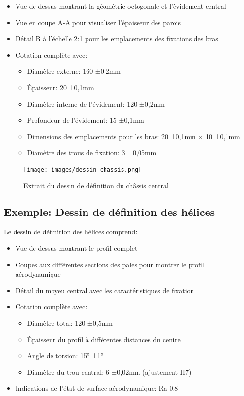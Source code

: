 \documentclass[a4paper,12pt]{report}
\begin{document}
\begin{itemize}
    \item Vue de dessus montrant la géométrie octogonale et l'évidement central
    \item Vue en coupe A-A pour visualiser l'épaisseur des parois
    \item Détail B à l'échelle 2:1 pour les emplacements des fixations des bras
    \item Cotation complète avec:
        \begin{itemize}
            \item Diamètre externe: 160 ±0,2mm
            \item Épaisseur: 20 ±0,1mm
            \item Diamètre interne de l'évidement: 120 ±0,2mm
            \item Profondeur de l'évidement: 15 ±0,1mm
            \item Dimensions des emplacements pour les bras: 20 ±0,1mm × 10 ±0,1mm
            \item Diamètre des trous de fixation: 3 ±0,05mm
        \end{itemize}
\end{itemize}

\begin{figure}[H]
    \centering
    \texttt{[image: images/dessin\_chassis.png]}
    \caption{Extrait du dessin de définition du châssis central}
    \label{fig:dessin_def}
\end{figure}

\subsection{Exemple: Dessin de définition des hélices}
Le dessin de définition des hélices comprend:

\begin{itemize}
    \item Vue de dessus montrant le profil complet
    \item Coupes aux différentes sections des pales pour montrer le profil aérodynamique
    \item Détail du moyeu central avec les caractéristiques de fixation
    \item Cotation complète avec:
        \begin{itemize}
            \item Diamètre total: 120 ±0,5mm
            \item Épaisseur du profil à différentes distances du centre
            \item Angle de torsion: 15° ±1°
            \item Diamètre du trou central: 6 ±0,02mm (ajustement H7)
        \end{itemize}
    \item Indications de l'état de surface aérodynamique: Ra 0,8
\end{itemize}
\end{document}
